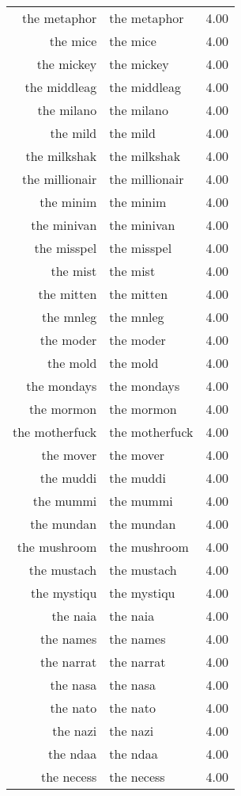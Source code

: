 \begin{table}[ht]
\begin{tabular}{rlr}
  the metaphor & the metaphor & 4.00 \\ 
  the mice & the mice & 4.00 \\ 
  the mickey & the mickey & 4.00 \\ 
  the middleag & the middleag & 4.00 \\ 
  the milano & the milano & 4.00 \\ 
  the mild & the mild & 4.00 \\ 
  the milkshak & the milkshak & 4.00 \\ 
  the millionair & the millionair & 4.00 \\ 
  the minim & the minim & 4.00 \\ 
  the minivan & the minivan & 4.00 \\ 
  the misspel & the misspel & 4.00 \\ 
  the mist & the mist & 4.00 \\ 
  the mitten & the mitten & 4.00 \\ 
  the mnleg & the mnleg & 4.00 \\ 
  the moder & the moder & 4.00 \\ 
  the mold & the mold & 4.00 \\ 
  the mondays & the mondays & 4.00 \\ 
  the mormon & the mormon & 4.00 \\ 
  the motherfuck & the motherfuck & 4.00 \\ 
  the mover & the mover & 4.00 \\ 
  the muddi & the muddi & 4.00 \\ 
  the mummi & the mummi & 4.00 \\ 
  the mundan & the mundan & 4.00 \\ 
  the mushroom & the mushroom & 4.00 \\ 
  the mustach & the mustach & 4.00 \\ 
  the mystiqu & the mystiqu & 4.00 \\ 
  the naia & the naia & 4.00 \\ 
  the names & the names & 4.00 \\ 
  the narrat & the narrat & 4.00 \\ 
  the nasa & the nasa & 4.00 \\ 
  the nato & the nato & 4.00 \\ 
  the nazi & the nazi & 4.00 \\ 
  the ndaa & the ndaa & 4.00 \\ 
  the necess & the necess & 4.00 \\ 

\end{tabular}
\end{table}
